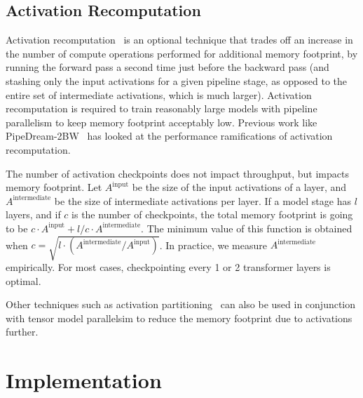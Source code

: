 \documentclass[sigconf,nonacm]{acmart}
\begin{document}
\vspace{0.1in}
\noindent{}

\subsection{Activation Recomputation}

Activation recomputation~\cite{huang2019gpipe, chen2016training, griewank2000algorithm, mlsys2020_196} is an optional technique that trades off an increase in the number of compute operations performed for additional memory footprint, by running the forward pass a second time just before the backward pass (and stashing only the input activations for a given pipeline stage, as opposed to the entire set of intermediate activations, which is much larger). Activation recomputation is required to train reasonably large models with pipeline parallelism to keep memory footprint acceptably low. Previous work like PipeDream-2BW~\cite{narayanan2021memory} has looked at the performance ramifications of activation recomputation. 

The number of activation checkpoints does not impact throughput, but impacts memory footprint. Let $A^\text{input}$ be the size of the input activations of a layer, and $A^\text{intermediate}$ be the size of intermediate activations per layer. If a model stage has $l$ layers, and if $c$ is the number of checkpoints, the total memory footprint is going to be $c \cdot A^\text{input} + l/c \cdot A^\text{intermediate}$. The minimum value of this function is obtained when $c = \sqrt{l \cdot \left(A^\text{intermediate} / A^\text{input}\right)}$. In practice, we measure $A^\text{intermediate}$ empirically. For most cases, checkpointing every 1 or 2 transformer layers is optimal.

Other techniques such as activation partitioning~\cite{rajbhandari2019zero} can also be used in conjunction with tensor model parallelsim to reduce the memory footprint due to activations further.
\section{Implementation}
\end{document}
